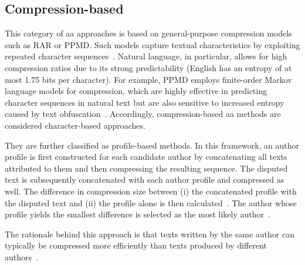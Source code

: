 \subsection{Compression-based}
This category of \ac{aa} approaches is based on general-purpose compression models such as RAR or PPMD. %
Such models capture textual characteristics by exploiting repeated character sequences~\citep{stamatatos_survey_2009,neal_surveying_2018}. 
Natural language, in particular, allows for high compression ratios due to its strong predictability (English has an entropy of at most 1.75 bits per character). 
For example, PPMD employs finite-order Markov language models for compression, which are highly effective in predicting character sequences in natural text but are also sensitive to increased entropy caused by text obfuscation~\citep{bevendorff_divergence_based_2020}.
Accordingly, compression-based \ac{aa} methods are considered character-based approaches.

They are further classified as profile-based methods. In this framework, an author profile is first constructed for each candidate author by concatenating all texts attributed to them and then compressing the resulting sequence. 
The disputed text is subsequently concatenated with each author profile and compressed as well. 
The difference in compression size between (i) the concatenated profile with the disputed text and (ii) the profile alone is then calculated~\citep{stamatatos_survey_2009,elmanarelbouanani_authorship_2014,neal_surveying_2018}. 
The author whose profile yields the smallest difference is selected as the most likely author~\citep{stamatatos_survey_2009,elmanarelbouanani_authorship_2014}.

The rationale behind this approach is that texts written by the same author can typically be compressed more efficiently than texts produced by different authors~\citep{stamatatos_survey_2009,elmanarelbouanani_authorship_2014}.


